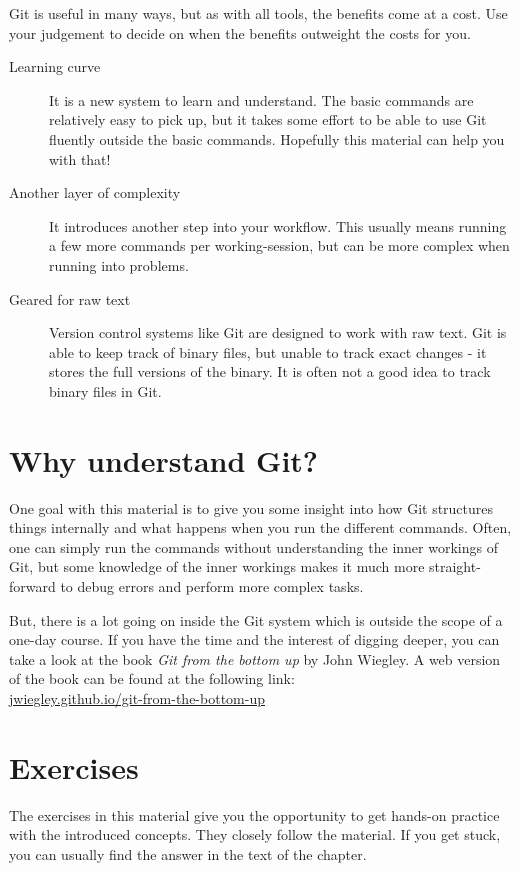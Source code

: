 \documentclass[../main/git_course_main.tex]{subfiles}
\begin{document}
Git is useful in many ways, but as with all tools, the benefits come at a cost. Use your judgement to decide on when the benefits outweight the costs for you.

\begin{description}
\item[Learning curve] It is a new system to learn and understand. The basic commands are relatively easy to pick up, but it takes some effort to be able to use Git fluently outside the basic commands. Hopefully this material can help you with that!
\item[Another layer of complexity] It introduces another step into your workflow. This usually means running a few more commands per working-session, but can be more complex when running into problems.
\item[Geared for raw text] Version control systems like Git are designed to work with raw text. Git is able to keep track of binary files, but unable to track exact changes - it stores the full versions of the binary. It is often not a good idea to track binary files in Git.
\end{description}

\section{Why understand Git?}

One goal with this material is to give you some insight into how Git structures things internally and what happens when you run the different commands.
Often, one can simply run the commands without understanding the inner workings of Git, but some knowledge of the inner workings makes it much more straight-forward to debug errors and perform more complex tasks.

But, there is a lot going on inside the Git system which is outside the scope of a one-day course. If you have the time and the interest of digging deeper, you can take a look at the book \textit{Git from the bottom up} by John Wiegley. A web version of the book can be found at the following link: \\

\url{jwiegley.github.io/git-from-the-bottom-up}

\newpage
\section{Exercises}

The exercises in this material give you the opportunity to get hands-on practice with the introduced concepts. They closely follow the material. If you get stuck, you can usually find the answer in the text of the chapter.
\end{document}
